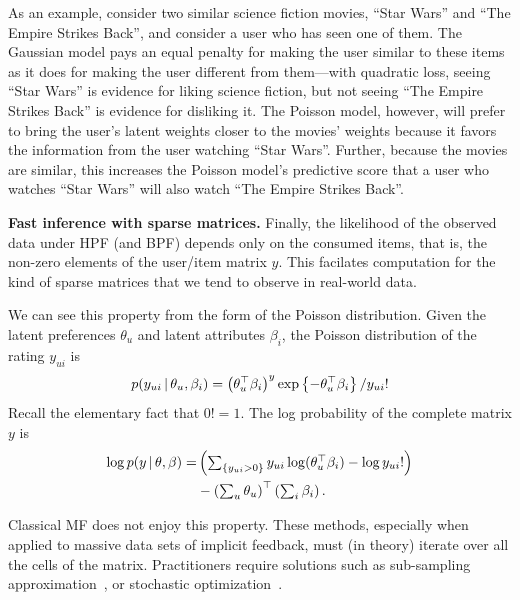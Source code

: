 As an example, consider two similar science fiction movies, ``Star
Wars'' and ``The Empire Strikes Back'', and consider a user who has
seen one of them.  The Gaussian model pays an equal penalty for making
the user similar to these items as it does for making the user
different from them---with quadratic loss, seeing ``Star Wars'' is
evidence for liking science fiction, but not seeing ``The Empire
Strikes Back'' is evidence for disliking it.  The Poisson model,
however, will prefer to bring the user's latent weights closer to the
movies' weights because it favors the information from the user
watching ``Star Wars''. Further, because the movies are similar, this
increases the Poisson model's predictive score that a user who watches
``Star Wars'' will also watch ``The Empire Strikes Back''.

{\bf Fast inference with sparse matrices.}  Finally, the likelihood of
the observed data under HPF (and BPF) depends only on the consumed
items, that is, the non-zero elements of the user/item matrix $y$.
This facilates computation for the kind of sparse matrices that we
tend to observe in real-world data.

We can see this property from the form of the Poisson distribution.
Given the latent preferences $\theta_u$ and latent attributes
$\beta_i$, the Poisson distribution of the rating $y_{ui}$ is
\begin{equation}
  p(y_{ui} \,\vert\, \theta_u, \beta_i) =
  \left(\theta_u^\top \beta_i\right)^y
  \exp\left\{-\theta_u^\top \beta_i \right\} / y_{ui}!
\end{equation}
Recall the elementary fact that $0! = 1$.  The log probability of the
complete matrix $y$ is
\begin{align}
  \log p(y \,\vert\, \theta, \beta) =
  & \left(\textstyle \sum_{\{y_{ui} > 0\}}
    y_{ui} \log (\theta_u^\top \beta_i) - \log y_{ui}!
  \right) \\
  & -
  \left(\textstyle\sum_{u} \theta_u\right)^\top \left(\textstyle
    \sum_{i} \beta_i\right). \nonumber
\end{align}

Classical MF does not enjoy this property. These methods, especially
when applied to massive data sets of implicit feedback, must (in
theory) iterate over all the cells of the matrix.  Practitioners
require solutions such as sub-sampling~\cite{Dror:2012a}
approximation~\cite{Hu:2008p9402}, or stochastic
optimization~\cite{Mairal:2010}.
